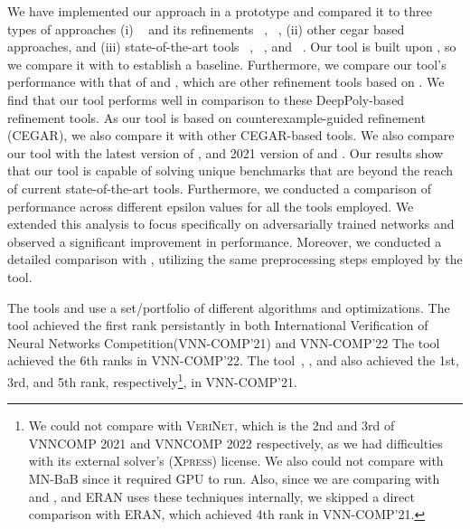 We have implemented our approach in a prototype and compared it to three types of approaches 
(i) \deeppoly{}~\cite{singh2019abstract} and its refinements \kpoly{}~\cite{singh2019beyond}, \deepsrgr{}~\cite{yang2021improving}, 
(ii) other cegar based approaches, and 
(iii) state-of-the-art tools \alphabeta~\cite{zhang2018efficient,wang2021beta,xu2020fast,zhang2022branch,tjeng2017evaluating}, 
\ovaltool~\cite{bunel2018unified,bunel2020branch,bunel2020lagrangian,de2021scaling,de2021scaling,de2021scaling2,de2021improved}, 
and \marabou~\cite{katz2019marabou}. 
Our tool is built upon \deeppoly{}, so we compare it with \deeppoly{} to establish a baseline. 
Furthermore, we compare our tool's performance with that of \kpoly{} and \deepsrgr{}, 
which are other refinement tools based on \deeppoly{}. 
We find that our tool performs well in comparison to these DeepPoly-based refinement tools.
As our tool is based on counterexample-guided refinement (CEGAR), we also compare it with other CEGAR-based tools. 
We also compare our tool with the latest version of \alphabeta{}, and 2021 version of \ovaltool{} and \marabou{}. 
Our results show that our tool is capable of solving unique benchmarks 
that are beyond the reach of current state-of-the-art tools.
Furthermore, we conducted a comparison of performance across different epsilon values for all the tools employed. 
We extended this analysis to focus specifically on adversarially trained networks and observed a significant improvement 
in performance. Moreover, we conducted a detailed comparison with \alphabeta{}, 
utilizing the same preprocessing steps employed by the \alphabeta{} tool.

The tools \alphabeta{} and \ovaltool{} use a set/portfolio of different algorithms and optimizations.
The tool \alphabeta{} achieved the first rank persistantly in both International Verification of Neural Networks Competition(VNN-COMP'21) and VNN-COMP'22
The tool \marabou{} achieved the 6th ranks in VNN-COMP'22.  
The tool~\alphabeta{}, \ovaltool{}, and \marabou{} also achieved the 1st, 3rd, and 5th rank, 
respectively\footnote{We could not compare with \textsc{VeriNet}, which is the 2nd and 3rd of VNNCOMP 2021 and VNNCOMP 2022 respectively, as we had difficulties with its external solver's (\textsc{Xpress}) license. We also
could not compare with MN-BaB since it required GPU to run.  
Also, since we are comparing with \deeppoly{} and \kpoly{}, and \textsc{ERAN} uses these techniques internally, we skipped a direct comparison with \textsc{ERAN}, which achieved 4th rank in VNN-COMP'21.}, 
in VNN-COMP'21.

